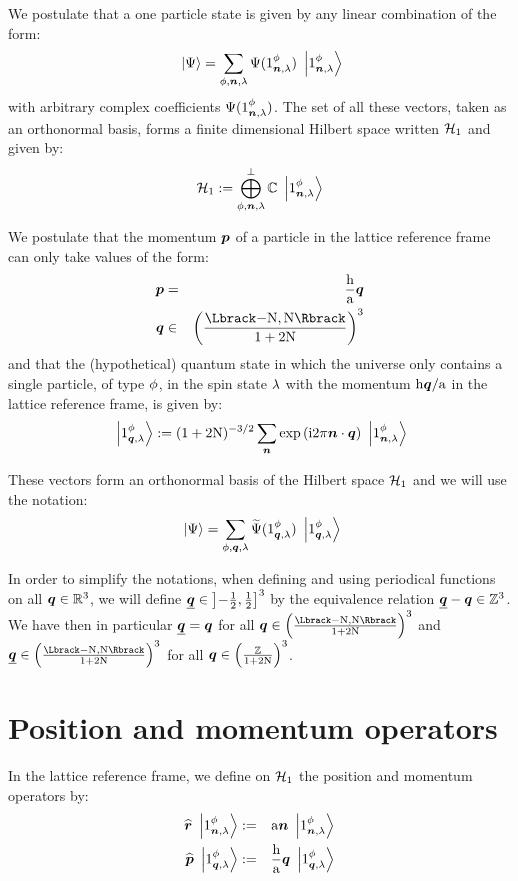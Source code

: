 We postulate that a one particle state is given by any linear combination of the form:
\begin{equation*}
\ket{\Psi} = \sum_{\pt,\n,\sp} \Psi(\bX 1 \pt \n \sp) \ketX 1 \pt \n \sp
\end{equation*}
with arbitrary complex coefficients $\Psi(\bX 1 \pt \n \sp)$. The set of all these vectors, taken as an orthonormal basis, forms a finite dimensional Hilbert space written $\Hn 1$ and given by:
\begin{equation*}
\Hn 1 \eqdef \bigoplus^\perp_{\pt,\n,\sp} \IC \ketX 1 \pt \n \sp
\end{equation*}

 We postulate that the momentum $\p$ of a particle in the lattice reference frame can only take values of the form:
\begin{eqnarray*}
\p & = & \frac \h \a \q\\
\q & \in & \FLD
\end{eqnarray*}
and that the (hypothetical) quantum state in which the universe only contains a single particle, of type $\pt$, in the spin state $\sp$ with the momentum $\h\q / \a$ in the lattice reference frame, is given by:
\begin{equation*}
\ketQ 1 \pt \q \sp \eqdef (1+2 \N)^{-3/2} \sum_{\n} \exp{\i 2 \pi \n \ssp \q} \ketX 1 \pt \n \sp
\end{equation*}

These vectors form an orthonormal basis of the Hilbert space $\Hn 1$ and we will use the notation:
\begin{equation*}
\ket\Psi = \sum_{\pt,\q,\sp} \FT\Psi(\bQ 1 \pt \q \sp) \ketQ 1 \pt \q \sp
\end{equation*}

 In order to simplify the notations, when defining and using periodical functions on all $\q \in \IR^3$, we will define $\eqp \q \in \left]-\frac 1 2,\frac 1 2\right]^3$ by the equivalence relation $\eqp \q - \q \in \IZ^3$. We have then in particular $\eqp \q = \q$ for all $\q \in \FLD$ and $\eqp \q \in \FLD$ for all $\q \in \ILD$.

\section{Position and momentum operators}

 In the lattice reference frame, we define on $\Hn 1$ the position and momentum operators by:
\begin{eqnarray*}
\Rop \ketX 1 \pt \n \sp & \eqdef & \a \n \ketX 1 \pt \n \sp \\
\Pop \ketQ 1 \pt \q \sp & \eqdef & \frac \h \a \q \ketQ 1 \pt \q \sp
\end{eqnarray*}

